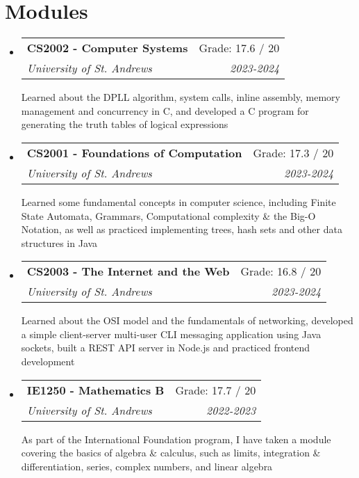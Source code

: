 \documentclass[letterpaper,11pt]{article}
\makeatletter
\newcommand{\resumeSubheading}[5]{
  \vspace{-1pt}\item
    \begin{tabular*}{0.97\textwidth}{l@{\extracolsep{\fill}}r}
      \textbf{#1} & #2 \\
      \textit{\small#3} & \textit{\small #4} \\
    \end{tabular*}
    \par{\small{#5}\vspace{-2pt}}
}
\newcommand{\resumeSubHeadingListStart}{\begin{itemize}[leftmargin=*]}
\newcommand{\resumeSubHeadingListEnd}{\end{itemize}}
\makeatother
\begin{document}
\section{Modules}
  \resumeSubHeadingListStart
    \resumeSubheading
      {CS2002 - Computer Systems}{Grade: 17.6 / 20}
      {University of St. Andrews}{2023-2024}
      { Learned about the DPLL algorithm, system calls, inline assembly, memory management and concurrency in C, and developed a C program for generating the truth tables of logical expressions }
    \resumeSubheading
      {CS2001 - Foundations of Computation}{Grade: 17.3 / 20}
      {University of St. Andrews}{2023-2024}
      { Learned some fundamental concepts in computer science, including Finite State Automata, Grammars, Computational complexity \& the Big-O Notation, as well as practiced implementing trees, hash sets and other data structures in Java }
    \resumeSubheading
      {CS2003 - The Internet and the Web}{Grade: 16.8 / 20}
      {University of St. Andrews}{2023-2024}
      { Learned about the OSI model and the fundamentals of networking, developed a simple client-server multi-user CLI messaging application using Java sockets, built a REST API server in Node.js and practiced frontend development }
    \resumeSubheading
      {IE1250 - Mathematics B}{Grade: 17.7 / 20}
      {University of St. Andrews}{2022-2023}
      { As part of the International Foundation program, I have taken a module covering the basics of algebra \& calculus, such as limits, integration \& differentiation, series, complex numbers, and linear algebra  }
     
   \resumeSubHeadingListEnd



\end{document}
